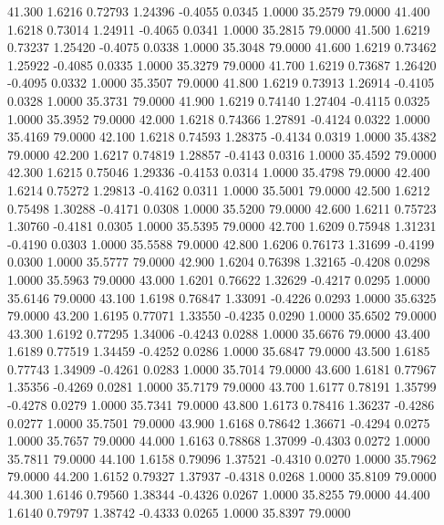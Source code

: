   41.300   1.6216   0.72793   1.24396  -0.4055   0.0345   1.0000  35.2579  79.0000
  41.400   1.6218   0.73014   1.24911  -0.4065   0.0341   1.0000  35.2815  79.0000
  41.500   1.6219   0.73237   1.25420  -0.4075   0.0338   1.0000  35.3048  79.0000
  41.600   1.6219   0.73462   1.25922  -0.4085   0.0335   1.0000  35.3279  79.0000
  41.700   1.6219   0.73687   1.26420  -0.4095   0.0332   1.0000  35.3507  79.0000
  41.800   1.6219   0.73913   1.26914  -0.4105   0.0328   1.0000  35.3731  79.0000
  41.900   1.6219   0.74140   1.27404  -0.4115   0.0325   1.0000  35.3952  79.0000
  42.000   1.6218   0.74366   1.27891  -0.4124   0.0322   1.0000  35.4169  79.0000
  42.100   1.6218   0.74593   1.28375  -0.4134   0.0319   1.0000  35.4382  79.0000
  42.200   1.6217   0.74819   1.28857  -0.4143   0.0316   1.0000  35.4592  79.0000
  42.300   1.6215   0.75046   1.29336  -0.4153   0.0314   1.0000  35.4798  79.0000
  42.400   1.6214   0.75272   1.29813  -0.4162   0.0311   1.0000  35.5001  79.0000
  42.500   1.6212   0.75498   1.30288  -0.4171   0.0308   1.0000  35.5200  79.0000
  42.600   1.6211   0.75723   1.30760  -0.4181   0.0305   1.0000  35.5395  79.0000
  42.700   1.6209   0.75948   1.31231  -0.4190   0.0303   1.0000  35.5588  79.0000
  42.800   1.6206   0.76173   1.31699  -0.4199   0.0300   1.0000  35.5777  79.0000
  42.900   1.6204   0.76398   1.32165  -0.4208   0.0298   1.0000  35.5963  79.0000
  43.000   1.6201   0.76622   1.32629  -0.4217   0.0295   1.0000  35.6146  79.0000
  43.100   1.6198   0.76847   1.33091  -0.4226   0.0293   1.0000  35.6325  79.0000
  43.200   1.6195   0.77071   1.33550  -0.4235   0.0290   1.0000  35.6502  79.0000
  43.300   1.6192   0.77295   1.34006  -0.4243   0.0288   1.0000  35.6676  79.0000
  43.400   1.6189   0.77519   1.34459  -0.4252   0.0286   1.0000  35.6847  79.0000
  43.500   1.6185   0.77743   1.34909  -0.4261   0.0283   1.0000  35.7014  79.0000
  43.600   1.6181   0.77967   1.35356  -0.4269   0.0281   1.0000  35.7179  79.0000
  43.700   1.6177   0.78191   1.35799  -0.4278   0.0279   1.0000  35.7341  79.0000
  43.800   1.6173   0.78416   1.36237  -0.4286   0.0277   1.0000  35.7501  79.0000
  43.900   1.6168   0.78642   1.36671  -0.4294   0.0275   1.0000  35.7657  79.0000
  44.000   1.6163   0.78868   1.37099  -0.4303   0.0272   1.0000  35.7811  79.0000
  44.100   1.6158   0.79096   1.37521  -0.4310   0.0270   1.0000  35.7962  79.0000
  44.200   1.6152   0.79327   1.37937  -0.4318   0.0268   1.0000  35.8109  79.0000
  44.300   1.6146   0.79560   1.38344  -0.4326   0.0267   1.0000  35.8255  79.0000
  44.400   1.6140   0.79797   1.38742  -0.4333   0.0265   1.0000  35.8397  79.0000
